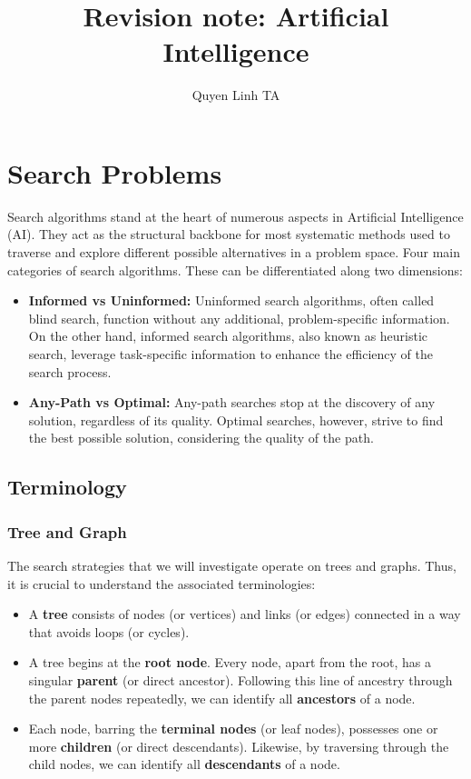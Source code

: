 \documentclass[a4paper,UKenglish,cleveref, autoref, thm-restate]{qlinhta}
\title{Revision note: Artificial Intelligence}
\author{Quyen Linh TA}{University Paris Dauphine, PSL}{quyen-linh.ta@dauphine.eu}{}{}
\begin{document}
    \maketitle

    \tableofcontents


    \section{Search Problems}
    Search algorithms stand at the heart of numerous aspects in Artificial Intelligence (AI). They act as the structural backbone for most systematic methods used to traverse and explore different possible alternatives in a problem space. Four main categories of search algorithms. These can be differentiated along two dimensions:

    \begin{itemize}
        \item \textbf{Informed vs Uninformed:} Uninformed search algorithms, often called blind search, function without any additional, problem-specific information. On the other hand, informed search algorithms, also known as heuristic search, leverage task-specific information to enhance the efficiency of the search process.
        \item \textbf{Any-Path vs Optimal:} Any-path searches stop at the discovery of any solution, regardless of its quality. Optimal searches, however, strive to find the best possible solution, considering the quality of the path.
    \end{itemize}

    \subsection{Terminology}

    \subsubsection{Tree and Graph}
    The search strategies that we will investigate operate on trees and graphs. Thus, it is crucial to understand the associated terminologies:

    \begin{itemize}
        \item A \textbf{tree} consists of nodes (or vertices) and links (or edges) connected in a way that avoids loops (or cycles).
        \item A tree begins at the \textbf{root node}. Every node, apart from the root, has a singular \textbf{parent} (or direct ancestor). Following this line of ancestry through the parent nodes repeatedly, we can identify all \textbf{ancestors} of a node.
        \item Each node, barring the \textbf{terminal nodes} (or leaf nodes), possesses one or more \textbf{children} (or direct descendants). Likewise, by traversing through the child nodes, we can identify all \textbf{descendants} of a node.
    \end{itemize}
\end{document}
